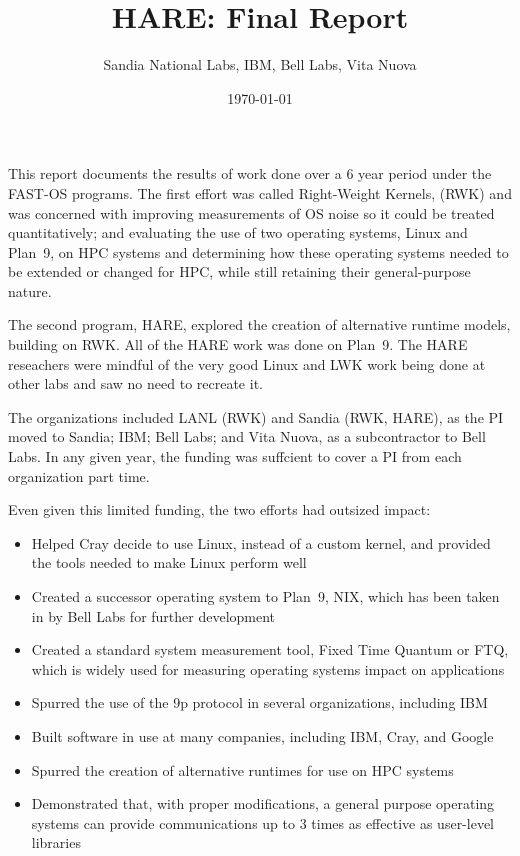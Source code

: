 \documentclass{report}
\title{HARE: Final Report}
\author{Sandia National Labs, IBM, Bell Labs, Vita Nuova}
\date{\today}
\begin{document}
\maketitle
\tableofcontents
\pagebreak

This report documents the results of work done over a 6 year period under the FAST-OS 
programs. The first effort was called Right-Weight Kernels, (RWK) and was concerned with 
improving measurements of OS noise so it could be treated quantitatively; 
and evaluating the use of two operating systems, Linux
and Plan~9, on HPC systems and determining how these operating systems needed
to be extended or changed for HPC, while still retaining their general-purpose nature. 

The second program, HARE, explored the creation of alternative runtime models, 
building on RWK. All of the HARE work was done on Plan~9. The HARE reseachers
were mindful of the very good Linux and LWK work being done at other labs and saw no
need to recreate it. 

The organizations included LANL (RWK) and Sandia (RWK, HARE), as the PI moved to Sandia; 
IBM; Bell Labs; and Vita Nuova, as a subcontractor to Bell Labs. In any given year, 
the funding was suffcient to cover a PI from each organization part time. 

Even given this limited funding, the two efforts had outsized impact: 
\begin{itemize}
\item Helped Cray decide to use Linux, instead of a custom kernel, and provided
the tools needed to make Linux perform well
\item Created a successor operating system to Plan~9, NIX, which has been taken in 
by Bell Labs for further development
\item Created a standard system measurement tool, Fixed Time Quantum or FTQ, which is widely
used for measuring operating systems impact on applications
\item Spurred the use of the 9p protocol in several organizations, including IBM
\item Built software in use at many companies, including IBM, Cray, and Google
\item Spurred the creation of alternative runtimes for use on HPC systems
\item Demonstrated that, with proper modifications, a general purpose operating systems
can provide communications up to 3 times as effective as user-level libraries
\end{itemize}
\end{document}
